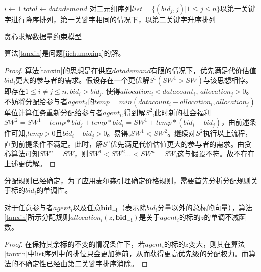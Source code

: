 \documentclass[promaster]{thesis-uestc}
\begin{document}
\begin{algorithm}[h] 
    $i \leftarrow 1$\;
    $total \leftarrow datademand $\;
    对二元组序列$list = \{(bid_j,j)|1 \leq j \leq n\}$以第一关键字进行降序排列，第一关键字相同的情况下，以第二关键字升序排列\;
\caption{贪心求解数据量约束模型}
\label{tanxin}
\end{algorithm}

\begin{theorem}
算法\ref{tanxin}是问题\ref{jichumoxing}的解。
\end{theorem}

\begin{proof}
    算法\ref{tanxin}的思想是在供应$datademand$有限的情况下，优先满足代价估值$bid_i$更大的参与者的需求。假设存在一个更优解$S^1(SW^1 > SW)$与该思想相悖。即存在$1 \leq i \neq j \leq n,bid_i > bid_j$, 使得$allocation_i < datacount_i \text{, } allocation_j > 0$。不妨将分配给参与者$agent_j$的$temp = min(datacount_i - allocation_i,allocation_j)$单位计算任务重新分配给参与者$agent_i$,得到解$S^2$,此时新的社会福利$SW^2= SW^1- temp*bid_j + temp*bid_i=SW^1+temp*(bid_i-bid_j)$，由前述条件可知,$temp > 0$且$bid_i - bid_j > 0$。易得,$SW^1<SW^2 $。继续对$S^2$执行以上流程，直到前提条件不满足。此时，解$S^n$优先满足代价估值更大的参与者的需求。由贪心算法可知$SW^n = SW$，则$SW^1<SW^2...<SW^n=SW$,这与假设不符。故不存在上述更优解。
\end{proof}

分配规则已经确定，为了应用麦尔森引理确定价格规则，需要首先分析分配规则关于标的$bid_i$的单调性。

\begin{theorem}
    对于任意参与者$agent_i$以及任意$\mathbf{bid_{-i}}$（表示除$bid_i$分量以外的总标的向量），算法\ref{tanxin}所示分配规则$allocation_i(z,\mathbf{bid_{-i}})$是关于$agent_i$的标的$z$的单调不减函数。
\end{theorem}

\begin{proof}
   在保持其余标的不变的情况条件下，若$agent_i$的标的$z$变大，则其在算法\ref{tanxin}中list序列中的排位只会更加靠前，从而获得更高优先级的分配权力。而算法的不确定性已经由第二关键字排序消除。
\end{proof}
\end{document}
